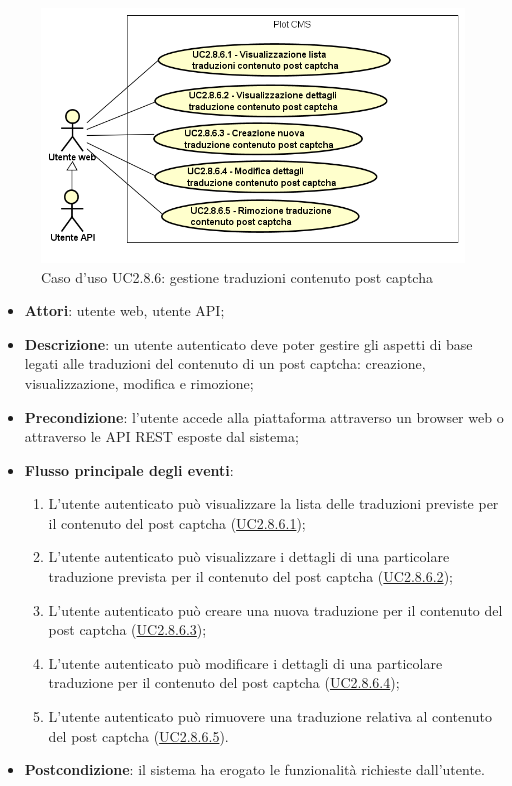         \begin{figure}[H]
            \centering
            \includegraphics[scale=0.95, width=\textwidth]{immagini/usecase/UC2-8-6.png}
            \caption{Caso d'uso UC2.8.6: gestione traduzioni contenuto post captcha}\label{fig:UC2.8.6} 
        \end{figure}
\begin{itemize}
\item \textbf{Attori}: utente web, utente API;
\item \textbf{Descrizione}: un utente autenticato deve poter gestire gli aspetti di base legati alle traduzioni del contenuto di un post captcha: creazione, visualizzazione, modifica e rimozione; 
      \item \textbf{Precondizione}: l'utente accede alla piattaforma attraverso un browser web o attraverso le API REST esposte dal sistema;

        \item \textbf{Flusso principale degli eventi}:
          \begin{enumerate}
          \item L'utente autenticato può visualizzare la lista delle traduzioni previste per il contenuto del post captcha (\hyperlink{UC2.8.6.1}{UC2.8.6.1});
          \item L'utente autenticato può visualizzare i dettagli di una particolare traduzione prevista per il contenuto del post captcha (\hyperlink{UC2.8.6.2}{UC2.8.6.2});
          \item L'utente autenticato può creare una nuova traduzione per il contenuto del post captcha (\hyperlink{UC2.8.6.3}{UC2.8.6.3});
          \item L'utente autenticato può modificare i dettagli di una particolare traduzione per il contenuto del post captcha (\hyperlink{UC2.8.6.4}{UC2.8.6.4});
          \item L'utente autenticato può rimuovere una traduzione relativa al contenuto del post captcha (\hyperlink{UC2.8.6.5}{UC2.8.6.5}).

      \end{enumerate}
    \item \textbf{Postcondizione}: 	il sistema ha erogato le funzionalità richieste dall'utente.
  \end{itemize}
\hypertarget{UC2.8.6.1}{}
